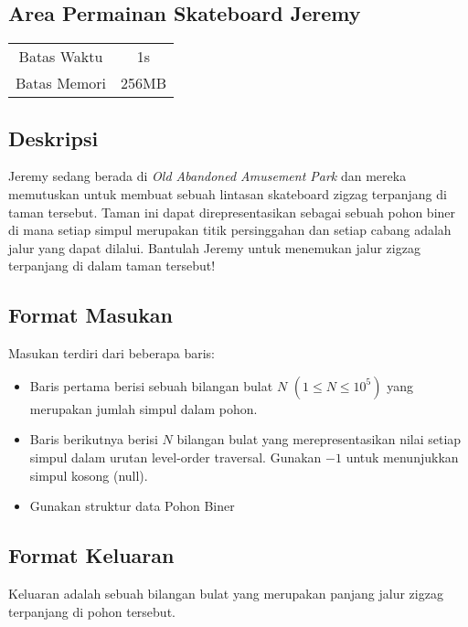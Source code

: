 \documentclass{article}
\begin{document}
\begin{center}
    \section*{Area Permainan Skateboard Jeremy}
    
    \begin{tabular}{ | c c | }
        \hline
        Batas Waktu  & 1s \\ 
        Batas Memori & 256MB \\ 
        \hline
    \end{tabular}
\end{center}

\subsection*{Deskripsi}

Jeremy sedang berada di \textit{Old Abandoned Amusement Park} dan mereka memutuskan untuk membuat sebuah lintasan skateboard zigzag terpanjang di taman tersebut. Taman ini dapat direpresentasikan sebagai sebuah pohon biner di mana setiap simpul merupakan titik persinggahan dan setiap cabang adalah jalur yang dapat dilalui. Bantulah Jeremy untuk menemukan jalur zigzag terpanjang di dalam taman tersebut!

\subsection*{Format Masukan}

Masukan terdiri dari beberapa baris:
\begin{itemize}
    \item Baris pertama berisi sebuah bilangan bulat $N$ $(1 \leq N \leq 10^5)$ yang merupakan jumlah simpul dalam pohon.
    \item Baris berikutnya berisi $N$ bilangan bulat yang merepresentasikan nilai setiap simpul dalam urutan level-order traversal. Gunakan $-1$ untuk menunjukkan simpul kosong (null).
    \item Gunakan struktur data Pohon Biner
\end{itemize}

\subsection*{Format Keluaran}

Keluaran adalah sebuah bilangan bulat yang merupakan panjang jalur zigzag terpanjang di pohon tersebut.
\end{document}
